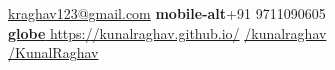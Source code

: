 \documentclass[10pt,a4paper]{extarticle}
\begin{document}
\begin{minipage}{0.55\textwidth}
	\vspace{-5mm}
	\href{mailto:kraghav123@gmail.com}{ kraghav123@gmail.com} \hspace{2mm} 
	\textbf{\color{cyan} \fontAwesome mobile-alt}\hspace{2mm}+91 9711090605\\
	\href{https://kunalraghav.github.io/}{{\textbf{\color{orange}\fontAwesome globe}}  https://kunalraghav.github.io/} \hspace{4mm}
	\href{https://peerlist.io/kunalraghav}{/kunalraghav}\\
	\href{https://github.com/KunalRaghav}{/KunalRaghav} \hspace{4mm}

\end{minipage}
\end{document}
